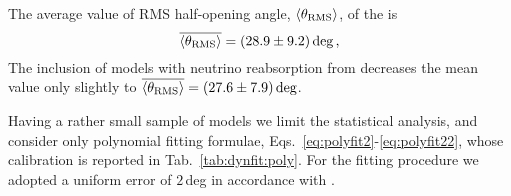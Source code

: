 %
The average value of \ac{RMS} half-opening angle, $\langle\theta_{\rm RMS}\rangle$, of the \DSrefset{} is 
%
\begin{equation}
\overline{\langle\theta_{\rm RMS}\rangle} = (28.9 \pm 9.2)\,\text{deg}\, ,
\end{equation}
%
The inclusion of models with neutrino reabsorption from \citet{Radice:2018pdn} decreases 
the mean value only slightly to $\overline{\langle\theta_{\rm RMS}\rangle}=(27.6 \pm 7.9)\,\text{deg}$.


%
Having a rather small sample of models we limit the statistical analysis, 
and consider only polynomial fitting formulae,  Eqs.~\eqref{eq:polyfit2}-\eqref{eq:polyfit22}, whose 
calibration is reported in Tab.~\ref{tab:dynfit:poly}. 
%
For the fitting procedure we adopted a uniform error of $2\,$deg in accordance with
\citet{Radice:2018pdn}.

